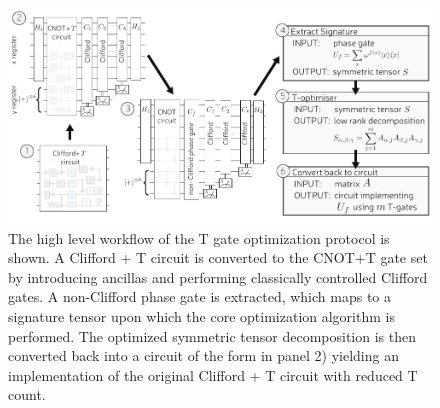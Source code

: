 \documentclass[notitlepage]{article}
\theoremstyle{definition}
\theoremstyle{problem}
\theoremstyle{lemma}
\begin{document}
\begin{figure}[h!]		
	\includegraphics{Overview4b}
	\caption{The high level workflow of the T gate optimization protocol is shown. A Clifford + T circuit is converted to the CNOT+T gate set by introducing ancillas and performing classically controlled Clifford gates. A non-Clifford phase gate is extracted, which maps to a signature tensor upon which the core optimization algorithm is performed. The optimized symmetric tensor decomposition is then converted back into a circuit of the form in panel 2) yielding an implementation of the original Clifford + T circuit with reduced T count. }
	\label{fig_overview}
\end{figure}
\end{document}
